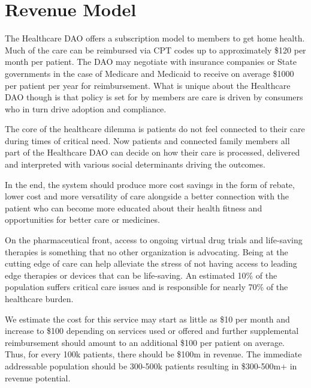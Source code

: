 \documentclass[11pt]{article}
\begin{document}
\section{Revenue Model}

The Healthcare DAO offers a subscription model to members to get home health. Much of the care can be reimbursed via CPT codes up to approximately \$120 per month per patient. The DAO may negotiate with insurance companies or State governments in the case of Medicare and Medicaid to receive on average \$1000 per patient per year for reimbursement. What is unique about the Healthcare DAO though is that policy is set for by members are care is driven by consumers who in turn drive adoption and compliance.


The core of the healthcare dilemma is patients do not feel connected to their care during times of critical need. Now patients and connected family members all part of the Healthcare DAO can decide on how their care is processed, delivered and interpreted with various social determinants driving the outcomes.


In the end, the system should produce more cost savings in the form of rebate, lower cost and more versatility of care alongside a better connection with the patient who can become more educated about their health fitness and opportunities for better care or medicines.


On the pharmaceutical front, access to ongoing virtual drug trials and life-saving therapies is something that no other organization is advocating. Being at the cutting edge of care can help alleviate the stress of not having access to leading edge therapies or devices that can be life-saving. An estimated 10\% of the population suffers critical care issues and is responsible for nearly 70\% of the healthcare burden.


We estimate the cost for this service may start as little as \$10 per month and increase to \$100 depending on services used or offered and further supplemental reimbursement should amount to an additional \$100 per patient on average. Thus, for every 100k patients, there should be \$100m in revenue. The immediate addressable population should be 300-500k patients resulting in \$300-500m+ in revenue potential.
\end{document}
